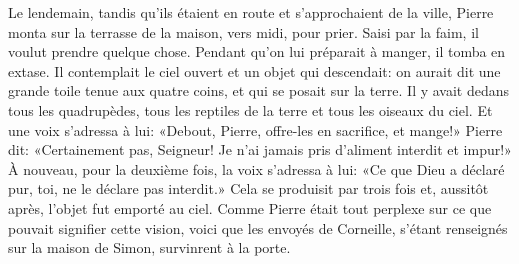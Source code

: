 Le lendemain, tandis qu’ils étaient en route et s’approchaient de la ville,
	Pierre monta sur la terrasse de la maison, vers midi, pour prier.
Saisi par la faim, il voulut prendre quelque chose.
	Pendant qu’on lui préparait à manger, il tomba en extase.
Il contemplait le ciel ouvert et un objet qui descendait:
	on aurait dit une grande toile tenue aux quatre coins,
	et qui se posait sur la terre.
Il y avait dedans tous les quadrupèdes,
	tous les reptiles de la terre et tous les oiseaux du ciel.
Et une voix s’adressa à lui:
	«Debout, Pierre, offre-les en sacrifice, et mange!»
Pierre dit: «Certainement pas, Seigneur!
	Je n’ai jamais pris d’aliment interdit et impur!»
À nouveau, pour la deuxième fois, la voix s’adressa à lui:
	«Ce que Dieu a déclaré pur, toi, ne le déclare pas interdit.»
Cela se produisit par trois fois
	et, aussitôt après, l’objet fut emporté au ciel.
Comme Pierre était tout perplexe sur ce que pouvait signifier cette vision,
	voici que les envoyés de Corneille,
		s’étant renseignés sur la maison de Simon,
	survinrent à la porte.
